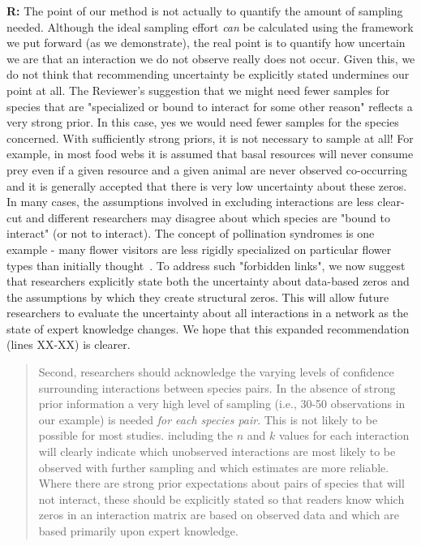 \documentclass[12pt]{letter}
\begin{document}
		\textbf{R:} The point of our method is not actually to quantify the amount of sampling needed. Although the ideal sampling effort \emph{can} be calculated using the framework we put forward (as we demonstrate), the real point is to quantify how uncertain we are that an interaction we do not observe really does not occur. Given this, we do not think that recommending uncertainty be explicitly stated undermines our point at all. 
		\smallskip
		The Reviewer's suggestion that we might need fewer samples for species that are "specialized or bound to interact for some other reason" reflects a very strong prior. In this case, yes we would need fewer samples for the species concerned. With sufficiently strong priors, it is not necessary to sample at all! For example, in most food webs it is assumed that basal resources will never consume prey even if a given resource and a given animal are never observed co-occurring and it is generally accepted that there is very low uncertainty about these zeros. In many cases, the assumptions involved in excluding interactions are less clear-cut and different researchers may disagree about which species are "bound to interact" (or not to interact). The concept of pollination syndromes is one example - many flower visitors are less rigidly specialized on particular flower types than initially thought~\citep{}. To address such "forbidden links", we now suggest that researchers explicitly state both the uncertainty about data-based zeros and the assumptions by which they create structural zeros. This will allow future researchers to evaluate the uncertainty about all interactions in a network as the state of expert knowledge changes. We hope that this expanded recommendation (lines XX-XX) is clearer.


		\begin{quotation}

			Second, researchers should acknowledge the varying levels of confidence surrounding interactions between species pairs. In the absence of strong prior information a very high level of sampling (i.e., 30-50 observations in our example) is needed \emph{for each species pair}. This is not likely to be possible for most studies. including the $n$ and $k$ values for each interaction will clearly indicate which unobserved interactions are most likely to be observed with further sampling and which estimates are more reliable. Where there are strong prior expectations about pairs of species that will not interact, these should be explicitly stated so that readers know which zeros in an interaction matrix are based on observed data and which are based primarily upon expert knowledge.

		\end{quotation}
\end{document}
